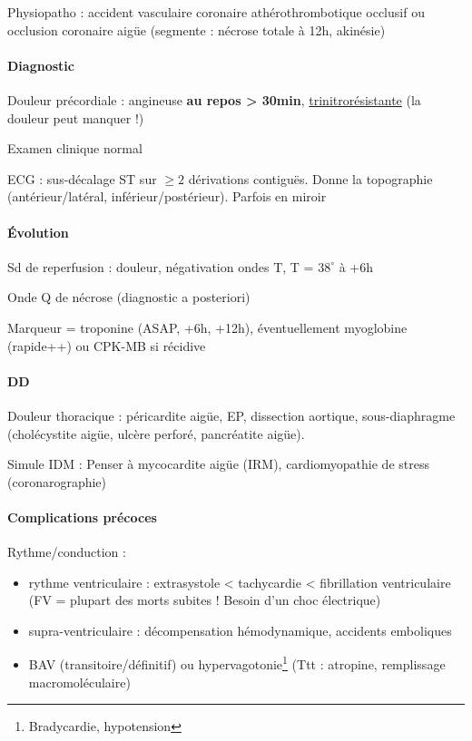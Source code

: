 \documentclass{article}
\begin{document}
Physiopatho : accident vasculaire coronaire athérothrombotique occlusif ou
occlusion coronaire aigüe (segmente : nécrose totale à 12h, akinésie)

\paragraph{Diagnostic}
Douleur précordiale : angineuse \textbf{au repos > 30min},
\underline{trinitrorésistante} (la douleur peut manquer !)

Examen clinique normal

ECG : sus-décalage ST sur $\ge 2$ dérivations contiguës. Donne la topographie
(antérieur/latéral, inférieur/postérieur).
Parfois en miroir


\paragraph{Évolution}
Sd de reperfusion : \dec douleur, négativation ondes T, T = $38^{\circ}$
à +6h

Onde Q de nécrose (diagnostic a posteriori)

Marqueur = troponine (ASAP, +6h, +12h), éventuellement myoglobine (rapide++) ou
CPK-MB si récidive

\paragraph{DD} 
Douleur thoracique : péricardite aigüe, EP, dissection aortique, sous-diaphragme (cholécystite aigüe,
ulcère perforé, pancréatite aigüe).

Simule IDM : Penser à mycocardite aigüe (IRM), cardiomyopathie de stress
(coronarographie)

\paragraph{Complications précoces}
Rythme/conduction : 
\begin{itemize}
  \item rythme ventriculaire : extrasystole < tachycardie < fibrillation
    ventriculaire (FV = plupart des morts subites ! Besoin d'un choc électrique)
  \item supra-ventriculaire : décompensation hémodynamique, accidents emboliques
  \item \gls{BAV} (transitoire/définitif) ou
    hypervagotonie\footnote{Bradycardie, hypotension} (Ttt : atropine, remplissage
    macromoléculaire)
\end{itemize}
\end{document}
